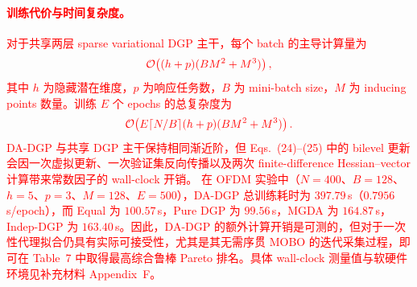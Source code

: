 \documentclass[11pt]{article}
\begin{document}
\textcolor{red}{\paragraph{训练代价与时间复杂度。}}%
\textcolor{red}{对于共享两层 sparse variational DGP 主干，每个 batch 的主导计算量为}%
\[
\textcolor{red}{\mathcal{O}\!\left((h+p)(BM^{2}+M^{3})\right),}
\]
\textcolor{red}{其中 $h$ 为隐藏潜在维度，$p$ 为响应任务数，$B$ 为 mini-batch size，$M$ 为 inducing points 数量。训练 $E$ 个 epochs 的总复杂度为}%
\[
\textcolor{red}{\mathcal{O}\!\left(E\lceil N/B\rceil(h+p)(BM^{2}+M^{3})\right).}
\]
\textcolor{red}{DA-DGP 与共享 DGP 主干保持相同渐近阶，但 Eqs.~(24)--(25) 中的 bilevel 更新会因一次虚拟更新、一次验证集反向传播以及两次 finite-difference Hessian--vector 计算带来常数因子的 wall-clock 开销。}%
\textcolor{red}{在 OFDM 实验中（$N=400$、$B=128$、$h=5$、$p=3$、$M=128$、$E=500$），DA-DGP 总训练耗时为 $397.79$\,s（$0.7956$\,s/epoch），而 Equal 为 $100.57$\,s，Pure DGP 为 $99.56$\,s，MGDA 为 $164.87$\,s，Indep-DGP 为 $163.40$\,s。因此，DA-DGP 的额外计算开销是可测的，但对于一次性代理拟合仍具有实际可接受性，尤其是其无需序贯 MOBO 的迭代采集过程，即可在 Table~7 中取得最高综合鲁棒 Pareto 排名。具体 wall-clock 测量值与软硬件环境见补充材料 Appendix~F。}%
\end{document}
